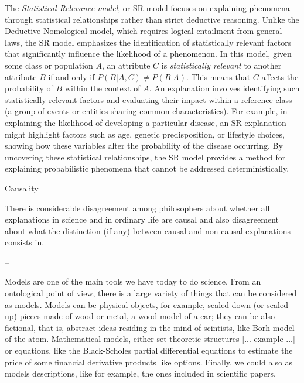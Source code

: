 The \emph{Statistical-Relevance model}, or SR model focuses on explaining phenomena through statistical relationships rather than strict deductive reasoning. Unlike the Deductive-Nomological model, which requires logical entailment from general laws, the SR model emphasizes the identification of statistically relevant factors that significantly influence the likelihood of a phenomenon. In this model, given some class or population \( A \), an attribute \( C \) is \emph{statistically relevant} to another attribute \( B \) if and only if \( P(B | A, C) \neq P(B | A) \). This means that \( C \) affects the probability of \( B \) within the context of \( A \). An explanation involves identifying such statistically relevant factors and evaluating their impact within a reference class (a group of events or entities sharing common characteristics). For example, in explaining the likelihood of developing a particular disease, an SR explanation might highlight factors such as age, genetic predisposition, or lifestyle choices, showing how these variables alter the probability of the disease occurring. By uncovering these statistical relationships, the SR model provides a method for explaining probabilistic phenomena that cannot be addressed deterministically.

Causality

{\color{red}

There is considerable disagreement among philosophers about whether all explanations in science and in ordinary life are causal and also disagreement about what the distinction (if any) between causal and non-causal explanations consists in. 

}

--

Models are one of the main tools we have today to do science. From an ontological point of view, there is a large variety of things that can be considered as models. Models can be physical objects, for example, scaled down (or scaled up) pieces made of wood or metal, a wood model of a car; they can be also fictional, that is, abstract ideas residing in the mind of scintists, like Borh model of the atom. Mathematical models, either set theoretic structures [... example ...] or equations, like the Black-Scholes partial differential equations to estimate the price of some financial derivative products like options. Finally, we could also as models descriptions, like for example, the ones included in scientific papers.

